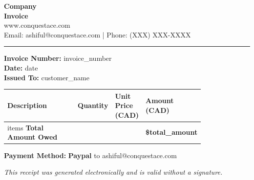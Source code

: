 \documentclass[10pt,a4paper]{article}
\begin{document}
\begin{center}
    \Huge \textbf{Company} \\[5pt]
    \large \textbf{Invoice} \\[5pt]
    \normalsize
    www.conquestace.com \\
    Email: ashiful@conquestace.com | Phone: (XXX) XXX-XXXX \\[10pt]
    \hrule
\end{center}

\begin{flushleft}
    \textbf{Invoice Number:} {{invoice_number}} \\
    \textbf{Date:} {{date}} \\
    \textbf{Issued To:} {{customer_name}} \\
\end{flushleft}

\vspace{10pt}
\renewcommand{\arraystretch}{1.5}
\begin{tabular}{|p{0.4\linewidth}|p{0.1\linewidth}|p{0.15\linewidth}|p{0.15\linewidth}|}
\hline
\textbf{Description} & \textbf{Quantity} & \textbf{Unit Price (CAD)} & \textbf{Amount (CAD)} \\
\hline
{{items}}
\textbf{Total Amount Owed} & & & \textbf{\${{total_amount}}} \\
\hline
\end{tabular}

\vspace{20pt}
\textbf{Payment Method:} \textbf{Paypal} to ashiful@conquestace.com  \\

\vfill
\begin{center}
    \textit{This receipt was generated electronically and is valid without a signature.}
\end{center}
\end{document}

